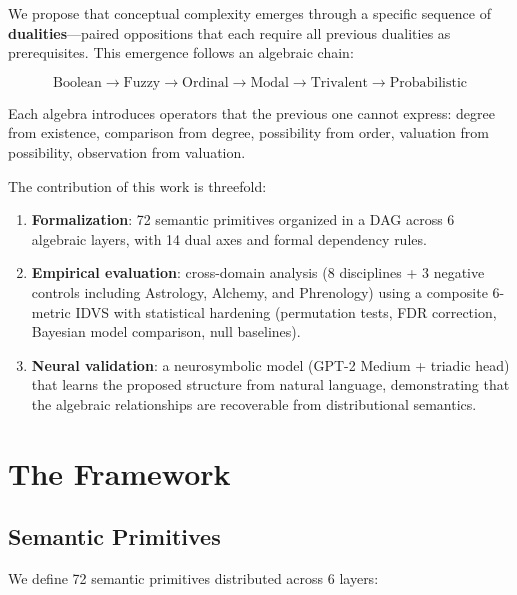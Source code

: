 \documentclass[11pt, a4paper]{article}
\begin{document}
We propose that conceptual complexity emerges through a specific sequence of \textbf{dualities}---paired oppositions that each require all previous dualities as prerequisites. This emergence follows an algebraic chain:

$$\text{Boolean} \to \text{Fuzzy} \to \text{Ordinal} \to \text{Modal} \to \text{Trivalent} \to \text{Probabilistic}$$

Each algebra introduces operators that the previous one cannot express: degree from existence, comparison from degree, possibility from order, valuation from possibility, observation from valuation.

The contribution of this work is threefold:

\begin{enumerate}[nosep, leftmargin=*]
    \item \textbf{Formalization}: 72 semantic primitives organized in a DAG across 6 algebraic layers, with 14 dual axes and formal dependency rules.
    \item \textbf{Empirical evaluation}: cross-domain analysis (8 disciplines + 3 negative controls including Astrology, Alchemy, and Phrenology) using a composite 6-metric IDVS with statistical hardening (permutation tests, FDR correction, Bayesian model comparison, null baselines).
    \item \textbf{Neural validation}: a neurosymbolic model (GPT-2 Medium + triadic head) that learns the proposed structure from natural language, demonstrating that the algebraic relationships are recoverable from distributional semantics.
\end{enumerate}

\section{The Framework}

\subsection{Semantic Primitives}

We define 72 semantic primitives distributed across 6 layers:
\end{document}
